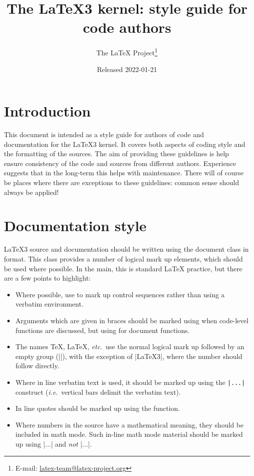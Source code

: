 \documentclass{l3doc}
\title{%
  The \LaTeX3 kernel: style guide for code authors%
}
\author{%
  The \LaTeX{} Project\thanks
    {%
      E-mail:
      \href{mailto:latex-team@latex-project.org}%
        {latex-team@latex-project.org}%
    }%
}
\date{Released 2022-01-21}
\begin{document}
\maketitle

\tableofcontents

\section{Introduction}

This document is intended as a style guide for authors of code and
documentation for the \LaTeX3 kernel. It covers both aspects of coding
style and the formatting of the sources. The aim of providing these
guidelines is help ensure consistency of the code and sources from
different authors. Experience suggests that in the long-term this helps
with maintenance. There will of course be places where there are
exceptions to these guidelines: common sense should always be
applied!

\section{Documentation style}

\LaTeX3 source and documentation should be written using the document
class  in  format. This class provides a number
of logical mark up elements, which should be used where possible.
In the main, this is standard \LaTeX{} practice, but there are a
few points to highlight:
\begin{itemize}
  \item
    Where possible, use  to mark up control sequences
    rather than using a verbatim environment.
  \item
    Arguments which are given in braces should be marked using
     when code-level functions are discussed, but using
     for document functions.
  \item
    The names \TeX{}, \LaTeX{}, \emph{etc}.\ use the normal logical mark
    up followed by an empty group (|{}|), with the exception of |\LaTeX3|,
    where the number should follow directly.
  \item
    Where in line verbatim text is used, it should be marked up
    using the \verb=|...|= construct (\emph{i.e.}~vertical bars delimit
    the verbatim text).
  \item In line quotes should be marked up using the 
    function.
  \item
    Where numbers in the source have a mathematical meaning,
    they should be included in math mode. Such in-line math mode
    material should be marked up using |$...$| and  \emph{not}
    |\(...\)|.
\end{itemize}
\end{document}
